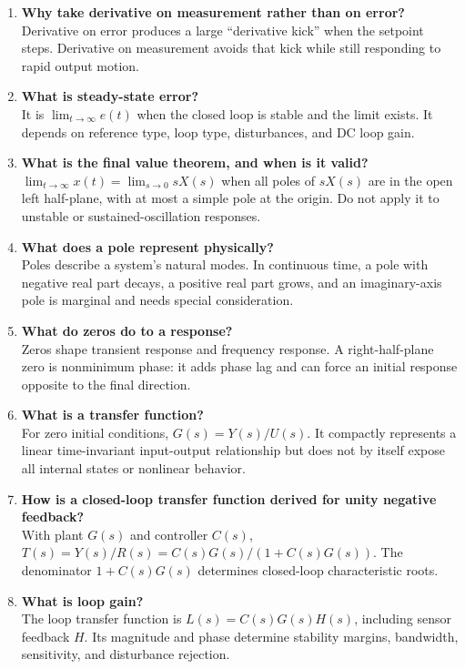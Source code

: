 \documentclass[11pt]{article}
\begin{document}
\begin{enumerate}
\item \textbf{Why take derivative on measurement rather than on error?}\\
Derivative on error produces a large ``derivative kick'' when the setpoint steps. Derivative on measurement avoids that kick while still responding to rapid output motion.

\item \textbf{What is steady-state error?}\\
It is $\lim_{t\to\infty}e(t)$ when the closed loop is stable and the limit exists. It depends on reference type, loop type, disturbances, and DC loop gain.

\item \textbf{What is the final value theorem, and when is it valid?}\\
$\lim_{t\to\infty}x(t)=\lim_{s\to0}sX(s)$ when all poles of $sX(s)$ are in the open left half-plane, with at most a simple pole at the origin. Do not apply it to unstable or sustained-oscillation responses.

\item \textbf{What does a pole represent physically?}\\
Poles describe a system's natural modes. In continuous time, a pole with negative real part decays, a positive real part grows, and an imaginary-axis pole is marginal and needs special consideration.

\item \textbf{What do zeros do to a response?}\\
Zeros shape transient response and frequency response. A right-half-plane zero is nonminimum phase: it adds phase lag and can force an initial response opposite to the final direction.

\item \textbf{What is a transfer function?}\\
For zero initial conditions, $G(s)=Y(s)/U(s)$. It compactly represents a linear time-invariant input-output relationship but does not by itself expose all internal states or nonlinear behavior.

\item \textbf{How is a closed-loop transfer function derived for unity negative feedback?}\\
With plant $G(s)$ and controller $C(s)$, $T(s)=Y(s)/R(s)=C(s)G(s)/(1+C(s)G(s))$. The denominator $1+C(s)G(s)$ determines closed-loop characteristic roots.

\item \textbf{What is loop gain?}\\
The loop transfer function is $L(s)=C(s)G(s)H(s)$, including sensor feedback $H$. Its magnitude and phase determine stability margins, bandwidth, sensitivity, and disturbance rejection.


\end{enumerate}
\end{document}
